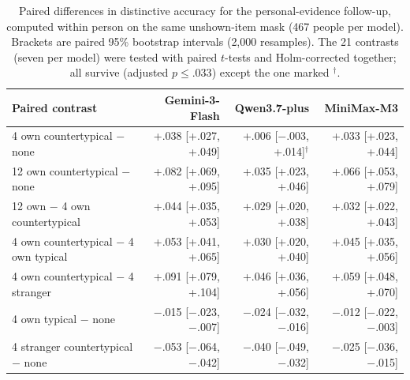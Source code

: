 \begin{table}[!t]
\centering\small
\begin{tabular}{@{}lrrr@{}}
\toprule
Paired contrast & Gemini-3-Flash & Qwen3.7-plus & MiniMax-M3\\
\midrule
4 own countertypical $-$ none & +.038 [+.027, +.049] & +.006 [$-$.003, +.014]$^{\dagger}$ & +.033 [+.023, +.044]\\
12 own countertypical $-$ none & +.082 [+.069, +.095] & +.035 [+.023, +.046] & +.066 [+.053, +.079]\\
12 own $-$ 4 own countertypical & +.044 [+.035, +.053] & +.029 [+.020, +.038] & +.032 [+.022, +.043]\\
4 own countertypical $-$ 4 own typical & +.053 [+.041, +.065] & +.030 [+.020, +.040] & +.045 [+.035, +.056]\\
4 own countertypical $-$ 4 stranger & +.091 [+.079, +.104] & +.046 [+.036, +.056] & +.059 [+.048, +.070]\\
4 own typical $-$ none & $-$.015 [$-$.023, $-$.007] & $-$.024 [$-$.032, $-$.016] & $-$.012 [$-$.022, $-$.003]\\
4 stranger countertypical $-$ none & $-$.053 [$-$.064, $-$.042] & $-$.040 [$-$.049, $-$.032] & $-$.025 [$-$.036, $-$.015]\\
\bottomrule
\end{tabular}
\caption{Paired differences in distinctive accuracy for the personal-evidence follow-up, computed within person on the same unshown-item mask (467 people per model). Brackets are paired 95\% bootstrap intervals (2,000 resamples). The 21 contrasts (seven per model) were tested with paired $t$-tests and Holm-corrected together; all survive (adjusted $p \le .033$) except the one marked $^{\dagger}$.}
\label{tab:exceptions_paired}
\end{table}
